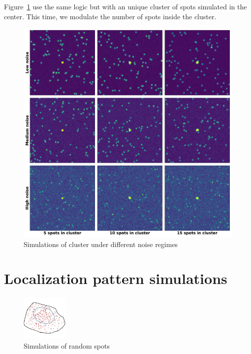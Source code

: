 \null
\vfill

\noindent
Figure~\ref{fig:cluster_mosaic} use the same logic but with an unique cluster of spots simulated in the center.
This time, we modulate the number of spots inside the cluster.

\vfill

\begin{figure}[h]
    \centering
    \includegraphics[width=\textwidth]{figures/appendix/cluster_mosaic}
    \caption{Simulations of cluster under different noise regimes}
    \label{fig:cluster_mosaic}
\end{figure}

\newpage

\section{Localization pattern simulations}
\label{sec:appendix_simulations_pattern}

\vfill

\begin{figure}[h]
    \centering
    \includegraphics[width=0.2\textwidth]{figures/appendix/random_1_300}
    \caption{Simulations of random spots}
    \label{fig:random_1_300}
\end{figure}

